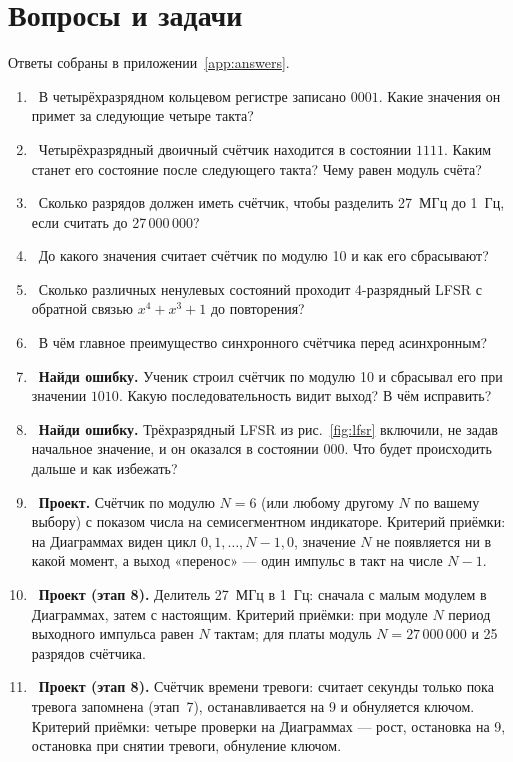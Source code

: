 \section{Вопросы и задачи}
\label{sec:tasks-regs}

Ответы собраны в приложении~\ref{app:answers}.

\begin{taskbox}
\begin{enumerate}
  \item {}~В четырёхразрядном кольцевом регистре записано $0001$. Какие значения он примет за следующие четыре такта?
  \item {}~Четырёхразрядный двоичный счётчик находится в состоянии $1111$. Каким станет его состояние после следующего такта? Чему равен модуль счёта?
  \item {}~Сколько разрядов должен иметь счётчик, чтобы разделить 27~МГц до 1~Гц, если считать до 27\,000\,000?
  \item {}~До какого значения считает счётчик по модулю 10 и как его сбрасывают?
  \item {}~Сколько различных ненулевых состояний проходит 4-разрядный LFSR с обратной связью $x^4 + x^3 + 1$ до повторения?
  \item {}~В чём главное преимущество синхронного счётчика перед асинхронным?
  \item {}~\textbf{Найди ошибку.} Ученик строил счётчик по модулю 10 и сбрасывал его при значении $1010$. Какую последовательность видит выход? В чём исправить?
  \item {}~\textbf{Найди ошибку.} Трёхразрядный LFSR из рис.~\ref{fig:lfsr} включили, не задав начальное значение, и он оказался в состоянии $000$. Что будет происходить дальше и как избежать?
  \item {}~\textbf{Проект.} Счётчик по модулю $N=6$ (или любому другому $N$ по вашему выбору) с показом числа на семисегментном индикаторе. Критерий приёмки: на Диаграммах виден цикл $0,1,\ldots,N-1,0$, значение $N$ не появляется ни в какой момент, а выход «перенос» --- один импульс в такт на числе $N-1$.
  \item {}~\textbf{Проект (этап 8).} Делитель 27~МГц в 1~Гц: сначала с малым модулем в Диаграммах, затем с настоящим. Критерий приёмки: при модуле $N$ период выходного импульса равен $N$ тактам; для платы модуль $N=27\,000\,000$ и 25 разрядов счётчика.
  \item {}~\textbf{Проект (этап 8).} Счётчик времени тревоги: считает секунды только пока тревога запомнена (этап~7), останавливается на 9 и обнуляется ключом. Критерий приёмки: четыре проверки на Диаграммах --- рост, остановка на 9, остановка при снятии тревоги, обнуление ключом.
\end{enumerate}
\end{taskbox}

